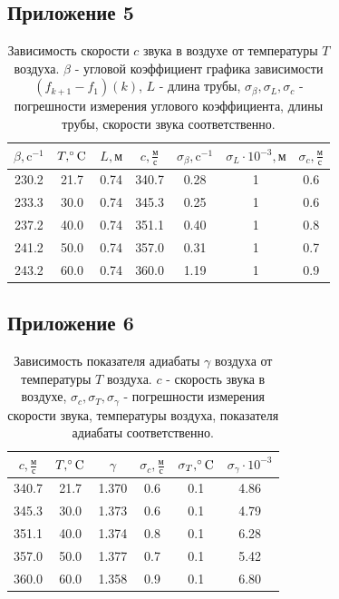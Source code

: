\subsection{Приложение 5} \label{Приложение 5}

\begin{table}[h]
    \centering
    \begin{tabular}{|c|c|c|c|c|c|c|}
    \hline
    $\beta, \text{c}^{-1}$ & $T, \celsius$ & $L, \text{м}$ & $c, \frac{\text{м}}{\text{с}}$ & $\sigma_\beta, \text{c}^{-1}$ & $\sigma_L\cdot 10^{-3}, \text{м}$ & $\sigma_c, \frac{\text{м}}{\text{с}}$ \\ \hline
    230.2   & 21.7 & 0.74 & 340.7 & 0.28 & 1 & 0.6 \\ \hline
    233.3   & 30.0 & 0.74 & 345.3 & 0.25 & 1 & 0.6 \\ \hline
    237.2   & 40.0 & 0.74 & 351.1 & 0.40 & 1 & 0.8 \\ \hline
    241.2   & 50.0 & 0.74 & 357.0 & 0.31 & 1 & 0.7 \\ \hline
    243.2   & 60.0 & 0.74 & 360.0 & 1.19 & 1 & 0.9 \\ \hline
\end{tabular}
    \caption{Зависимость скорости $c$ звука в воздухе от температуры $T$ воздуха. $\beta$ - угловой коэффициент графика зависимости $(f_{k+1} - f_1)(k)$, $L$ - длина трубы, $\sigma_\beta, \sigma_L, \sigma_c$ - погрешности измерения углового коэффициента, длины трубы, скорости звука соответственно.}
    \label{tab:t10}
\end{table}
\newpage
\subsection{Приложение 6} \label{Приложение 6}

\begin{table}[h]
    \centering
    \begin{tabular}{|c|c|c|c|c|c|}
    \hline
    $c, \frac{\text{м}}{\text{с}}$ & $T, \celsius$ & $\gamma$ & $\sigma_c, \frac{\text{м}}{\text{с}}$ &  $\sigma_T, \celsius$ & $\sigma_\gamma\cdot 10^{-3}$ \\ \hline
    340.7   & 21.7 & 1.370 & 0.6 & 0.1 & 4.86 \\ \hline
    345.3   & 30.0 & 1.373 & 0.6 & 0.1 & 4.79 \\ \hline
    351.1   & 40.0 & 1.374 & 0.8 & 0.1 & 6.28 \\ \hline
    357.0   & 50.0 & 1.377 & 0.7 & 0.1 & 5.42 \\ \hline
    360.0   & 60.0 & 1.358 & 0.9 & 0.1 & 6.80 \\ \hline
\end{tabular}
    \caption{Зависимость показателя адиабаты $\gamma$ воздуха от температуры $T$ воздуха. $c$ - скорость звука в воздухе, $\sigma_c, \sigma_T, \sigma_\gamma$ - погрешности измерения скорости звука, температуры воздуха, показателя адиабаты соответственно.}
    \label{tab:t10}
\end{table}

